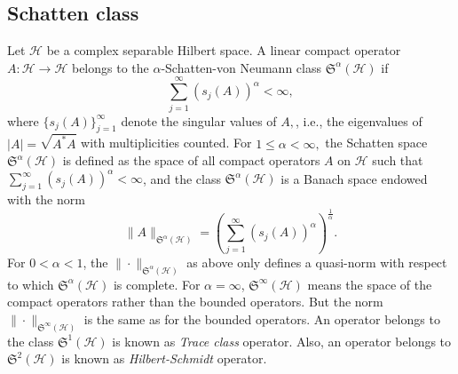 \documentclass[a4paper,11pt, reqno]{amsart}
\numberwithin{equation}{section}
\theoremstyle{plain}
\theoremstyle{definition}
\theoremstyle{remark}
\begin{document}
\subsection{Schatten class} 		
Let \(\mathcal{H}\) be a complex separable Hilbert space. A linear compact operator \(A : \mathcal{H} \rightarrow \mathcal{H}\) belongs to the $\alpha$-Schatten-von Neumann class \(\mathfrak{S}^\alpha(\mathcal{H})\) if
	$$
	\sum_{j=1}^{\infty}\left(s_j(A)\right)^\alpha<\infty,
	$$where $\{s_j(A)\}_{j=1}^\infty$ denote the singular values of \(A,\), i.e., the eigenvalues of \(|A|=\sqrt{A^{*} A}\)
	with multiplicities counted. For $1 \leq \alpha<\infty,$ the Schatten space $\mathfrak{S}^\alpha(\mathcal{H})$ is defined as the space of all compact operators $A$ on $\mathcal{H}$ such that $\displaystyle \sum_{j=1}^\infty  \left(s_j(A)\right)^\alpha<\infty$, and the class \(\mathfrak{S}^\alpha(\mathcal{H})\) is a Banach space
	endowed with the norm
$$\|A\|_{\mathfrak{S}^\alpha(\mathcal{H})}=\left(\sum_{j=1}^{\infty}\left(s_j(A)\right)^\alpha\right)^{\frac{1}{\alpha}}.
	$$
	For  \(0<\alpha<1\), the $\|\cdot\|_{\mathfrak{S}^\alpha(\mathcal{H})}$ as above only defines a quasi-norm with respect to which
	\(\mathfrak{S}^\alpha(\mathcal{H})\) is complete. For $\alpha=\infty$, \(\mathfrak{S}^\infty(\mathcal{H})\) means the
space of the compact operators rather than the bounded operators. But the norm $\|\cdot\|_{\mathfrak{S}^\infty(\mathcal{H})}$ is the
same as for the bounded operators. An operator belongs to the class \(\mathfrak{S}^{1}(\mathcal{H})\) is known as {\it Trace class} operator. Also, an operator belongs to   \(\mathfrak{S}^{2}(\mathcal{H})\) is known as  {\it Hilbert-Schmidt} operator.
\end{document}

